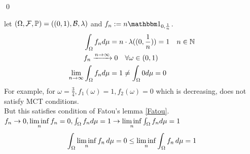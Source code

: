 \qed
\newpage
\begin{example}
let $(\Omega, \mathcal{F}, \mathbb{P}) = ((0,1), \mathcal{B}, \lambda)$ and $f_n:= n\I_{0,\frac{1}{n}}$.
\begin{align*}
    &\int_\Omega f_n d\mu = n \cdot \lambda((0,\frac{1}{n})) = 1 \quad n\in \mathbb{N}\\
    &f_n \xrightarrow{n\rightarrow \infty} 0\quad \forall \omega \in (0,1) \\
    \lim\limits_{n\rightarrow \infty}& \int_\Omega f_n d\mu = 1 \neq \int_\Omega 0 d\mu =0
\end{align*}For example, for $\omega = \frac{3}{4}, f_1(\omega)=1, f_2(\omega)=0$ which is decreasing, does not satisfy MCT conditions.\\[0.5cm]
But this satisfies condition of Fatou's lemma \ref{Fatou}. \\
$f_n \rightarrow 0, \liminf\limits_{n}f_n =0, \int_{\Omega} f_n d\mu = 1 \rightarrow \liminf\limits_{n}\int_{\Omega} f_n d\mu = 1$
\begin{equation*}
    \int_{\Omega} \liminf\limits_{n}f_n \mathop{}\!d \mu =0 \leq \liminf\limits_{n}\int_{\Omega} f_n \mathop{}\!d\mu =1
\end{equation*}
\end{example}

